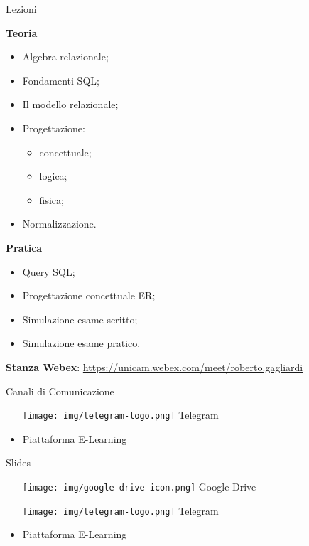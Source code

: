 \begin{frame}{Lezioni}

    {\begin{minipage}[t]{.5\textwidth}
    \textbf{Teoria}
    \begin{itemize}
        \item Algebra relazionale;
        \item Fondamenti SQL;
        \item Il modello relazionale;
        \item Progettazione:
        \begin{itemize}
            \item concettuale;
            \item logica;
            \item fisica;
        \end{itemize}
        \item Normalizzazione.
    \end{itemize}
    \end{minipage}%
    \begin{minipage}[t]{.5\textwidth}
    \textbf{Pratica}
    \begin{itemize}
        \item Query SQL;
        \item Progettazione concettuale ER;
        \item Simulazione esame scritto;
        \item Simulazione esame pratico.
    \end{itemize}
    \end{minipage}}
    
    \vspace{1cm}
    \centering
    \textbf{Stanza Webex}: \href{https://unicam.webex.com/meet/roberto.gagliardi}{https://unicam.webex.com/meet/roberto.gagliardi}
    \end{frame}
    
    \begin{frame}{Canali di Comunicazione}
        \begin{itemize}
        \item [{\texttt{[image: img/telegram-logo.png]}}] Telegram
        \item Piattaforma E-Learning
        \end{itemize}
    \end{frame}
    
    \begin{frame}{Slides}
        \begin{itemize}
        \item [{\texttt{[image: img/google-drive-icon.png]}}] Google Drive
        \item [{\texttt{[image: img/telegram-logo.png]}}] Telegram
        \item Piattaforma E-Learning
        \end{itemize}
    \end{frame}